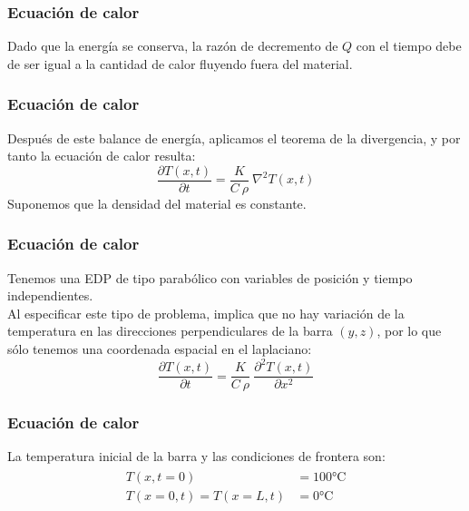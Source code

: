 \begin{frame}
\frametitle{Ecuación de calor}
Dado que la energía se conserva, la razón de decremento de $Q$ con el tiempo debe de ser igual a la cantidad de calor fluyendo fuera del material. 
\end{frame}
\begin{frame}
\frametitle{Ecuación de calor}
Después de este balance de energía, aplicamos el teorema de la divergencia, y por tanto la ecuación de calor resulta:
\begin{equation}
\dfrac{\partial T(x,t)}{\partial t} = \dfrac{K}{C \: \rho} \: \nabla^{2} T(x,t)
\label{eq:ecuacion_17_57}
\end{equation}
Suponemos que la densidad del material es constante.
\end{frame}
\begin{frame}
\frametitle{Ecuación de calor}
Tenemos una EDP de tipo parabólico con variables de posición y tiempo independientes. 
\\
\bigskip
Al especificar este tipo de problema, implica que no hay variación de la temperatura en las direcciones perpendiculares de la barra $(y, z)$, por lo que sólo tenemos una coordenada espacial en el laplaciano:
\begin{equation}
\dfrac{\partial T(x,t)}{\partial t} = \dfrac{K}{C \: \rho} \: \dfrac{\partial^{2} T(x, t)}{\partial x^{2}}
\label{eq:ecuacion_17_58}
\end{equation}
\end{frame}
\begin{frame}
\frametitle{Ecuación de calor}
La temperatura inicial de la barra y las condiciones de frontera son:
\begin{align}
\begin{aligned}
T(x, t=0) &= 100 \si\celsius \\
T(x=0, t) = T(x=L, t) &= 0 \si\celsius
\end{aligned}
\label{eq:ecuacion_17_59}
\end{align}
\end{frame}
